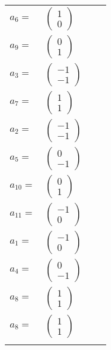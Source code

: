 \documentclass[1p]{elsarticle_modified}
\theoremstyle{definition}
\begin{document}
\begin{tabular}{m{7pt} m{180pt} m{7pt} m{180pt} }
\flushright $a_{6}=$&$\begin{pmatrix}1\\0\end{pmatrix}$ \\
\flushright $a_{9}=$&$\begin{pmatrix}0\\1\end{pmatrix}$ \\
\flushright $a_{3}=$&$\begin{pmatrix}-1\\-1\end{pmatrix}$ \\
\flushright $a_{7}=$&$\begin{pmatrix}1\\1\end{pmatrix}$ \\
\flushright $a_{2}=$&$\begin{pmatrix}-1\\-1\end{pmatrix}$ \\
\flushright $a_{5}=$&$\begin{pmatrix}0\\-1\end{pmatrix}$ \\
\flushright $a_{10}=$&$\begin{pmatrix}0\\1\end{pmatrix}$ \\
\flushright $a_{11}=$&$\begin{pmatrix}-1\\0\end{pmatrix}$ \\
\flushright $a_{1}=$&$\begin{pmatrix}-1\\0\end{pmatrix}$ \\
\flushright $a_{4}=$&$\begin{pmatrix}0\\-1\end{pmatrix}$ \\
\flushright $a_{8}=$&$\begin{pmatrix}1\\1\end{pmatrix}$\\ \flushright $a_{8}=$&$\begin{pmatrix}1\\1\end{pmatrix}$\\&\end{tabular}
\end{document}
